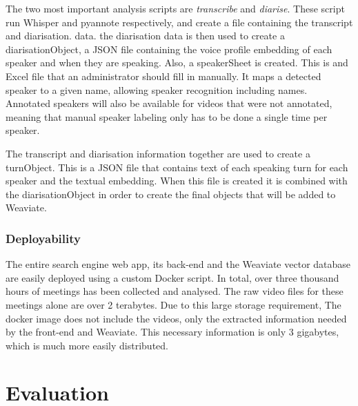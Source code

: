 \documentclass[twoside]{uva-inf-bachelor-thesis}
\begin{document}
The two most important analysis scripts are \textit{transcribe} and \textit{diarise}. These script run Whisper and pyannote respectively, and create a file containing the transcript and diarisation. data. the diarisation data is then used to create a diarisationObject, a JSON file containing the voice profile embedding of each speaker and when they are speaking. Also, a speakerSheet is created. This is and Excel file that an administrator should fill in manually. It maps a detected speaker to a given name, allowing speaker recognition including names. Annotated speakers will also be available for videos that were not annotated, meaning that manual speaker labeling only has to be done a single time per speaker.

The transcript and diarisation information together are used to create a turnObject. This is a JSON file that contains text of each speaking turn for each speaker and the textual embedding. When this file is created it is combined with the diarisationObject in order to create the final objects that will be added to Weaviate.

\subsection{Deployability}
The entire search engine web app, its back-end and the Weaviate vector database are easily deployed using a custom Docker script. In total, over three thousand hours of meetings has been collected and analysed. The raw video files for these meetings alone are over 2 terabytes. Due to this large storage requirement, The docker image does not include the videos, only the extracted information needed by the front-end and Weaviate.
This necessary information is only 3 gigabytes, which is much more easily distributed.

\chapter{Evaluation}

\end{document}

